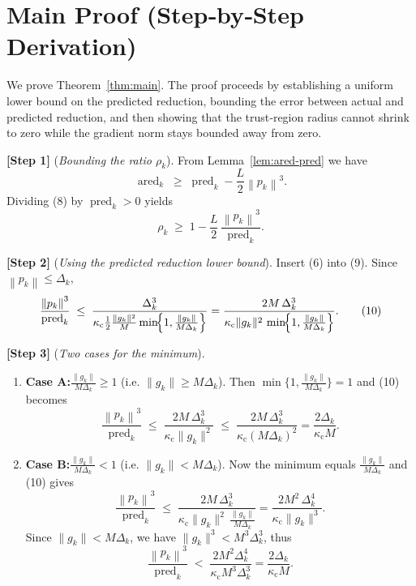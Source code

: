 \documentclass{article}
\newcommand{\norm}[1]{\left\lVert#1\right\rVert}
\begin{document}
\section*{Main Proof (Step‑by‑Step Derivation)}
We prove Theorem~\ref{thm:main}.  The proof proceeds by establishing a
uniform lower bound on the predicted reduction, bounding the error between
actual and predicted reduction, and then showing that the trust‑region radius
cannot shrink to zero while the gradient norm stays bounded away from zero.

\noindent\textbf{[Step 1]} (\emph{Bounding the ratio \(\rho_k\)}).  
From Lemma~\ref{lem:ared-pred} we have
\[
\operatorname{ared}_k
\;\ge\;
\operatorname{pred}_k - \frac{L}{2}\norm{p_k}^{3}.
\tag{8}
\]
Dividing (8) by \(\operatorname{pred}_k>0\) yields
\[
\rho_k
\;\ge\;
1 - \frac{L}{2}\,\frac{\norm{p_k}^{3}}{\operatorname{pred}_k}.
\tag{9}
\]

\noindent\textbf{[Step 2]} (\emph{Using the predicted reduction lower bound}).  
Insert (6) into (9).  Since \(\norm{p_k}\le\Delta_k\),
\[
\frac{\norm{p_k}^{3}}{\operatorname{pred}_k}
\;\le\;
\frac{\Delta_k^{3}}
{\kappa_{\mathrm{c}}\frac12\frac{\|g_k\|^{2}}{M}
\min\!\Bigl\{1,\frac{\|g_k\|}{M\Delta_k}\Bigr\}}
=
\frac{2M\,\Delta_k^{3}}
{\kappa_{\mathrm{c}}\|g_k\|^{2}\,
\min\!\Bigl\{1,\frac{\|g_k\|}{M\Delta_k}\Bigr\}}.
\tag{10}
\]

\noindent\textbf{[Step 3]} (\emph{Two cases for the minimum}).  

\begin{enumerate}
\item \textbf{Case A:}\(\displaystyle \frac{\|g_k\|}{M\Delta_k}\ge 1\) (i.e. \(\|g_k\|\ge M\Delta_k\)).  
Then \(\min\{1,\frac{\|g_k\|}{M\Delta_k}\}=1\) and (10) becomes
\[
\frac{\norm{p_k}^{3}}{\operatorname{pred}_k}
\;\le\;
\frac{2M\,\Delta_k^{3}}{\kappa_{\mathrm{c}}\|g_k\|^{2}}
\;\le\;
\frac{2M\,\Delta_k^{3}}{\kappa_{\mathrm{c}}(M\Delta_k)^{2}}
=
\frac{2\Delta_k}{\kappa_{\mathrm{c}}M}.
\tag{11}
\]

\item \textbf{Case B:}\(\displaystyle \frac{\|g_k\|}{M\Delta_k}< 1\) (i.e. \(\|g_k\|< M\Delta_k\)).  
Now the minimum equals \(\frac{\|g_k\|}{M\Delta_k}\) and (10) gives
\[
\frac{\norm{p_k}^{3}}{\operatorname{pred}_k}
\;\le\;
\frac{2M\,\Delta_k^{3}}
{\kappa_{\mathrm{c}}\|g_k\|^{2}\,\frac{\|g_k\|}{M\Delta_k}}
=
\frac{2M^{2}\,\Delta_k^{4}}{\kappa_{\mathrm{c}}\|g_k\|^{3}}.
\tag{12}
\]
Since \(\|g_k\|<M\Delta_k\), we have \(\|g_k\|^{3}<M^{3}\Delta_k^{3}\), thus
\[
\frac{\norm{p_k}^{3}}{\operatorname{pred}_k}
\;<\;
\frac{2M^{2}\Delta_k^{4}}{\kappa_{\mathrm{c}}M^{3}\Delta_k^{3}}
=
\frac{2\Delta_k}{\kappa_{\mathrm{c}}M}.
\tag{13}
\]
\end{enumerate}
\end{document}
